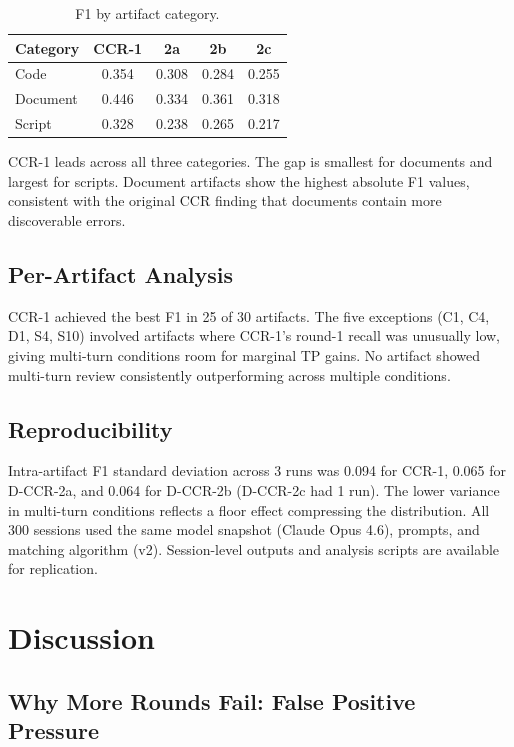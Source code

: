 \documentclass[11pt]{article}
\begin{document}
\begin{table}[t]
\centering
\caption{F1 by artifact category.}
\label{tab:category}
\small
\begin{tabular}{lcccc}
\toprule
\textbf{Category} & \textbf{CCR-1} & \textbf{2a} & \textbf{2b} & \textbf{2c} \\
\midrule
Code & 0.354 & 0.308 & 0.284 & 0.255 \\
Document & 0.446 & 0.334 & 0.361 & 0.318 \\
Script & 0.328 & 0.238 & 0.265 & 0.217 \\
\bottomrule
\end{tabular}
\end{table}

CCR-1 leads across all three categories.
The gap is smallest for documents and largest for scripts.
Document artifacts show the highest absolute F1 values, consistent with the original CCR finding that documents contain more discoverable errors.

\subsection{Per-Artifact Analysis}

CCR-1 achieved the best F1 in 25 of 30 artifacts.
The five exceptions (C1, C4, D1, S4, S10) involved artifacts where CCR-1's round-1 recall was unusually low, giving multi-turn conditions room for marginal TP gains.
No artifact showed multi-turn review consistently outperforming across multiple conditions.

\subsection{Reproducibility}

Intra-artifact F1 standard deviation across 3 runs was 0.094 for CCR-1, 0.065 for D-CCR-2a, and 0.064 for D-CCR-2b (D-CCR-2c had 1 run).
The lower variance in multi-turn conditions reflects a floor effect compressing the distribution.
All 300 sessions used the same model snapshot (Claude Opus 4.6), prompts, and matching algorithm (v2).
Session-level outputs and analysis scripts are available for replication.

\section{Discussion}
\label{sec:discussion}

\subsection{Why More Rounds Fail: False Positive Pressure}
\end{document}
